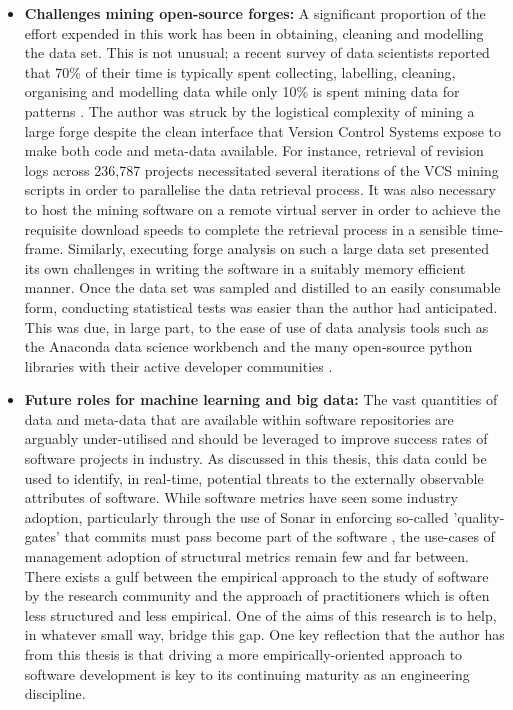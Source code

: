 \begin{itemize}
\item  \textbf{Challenges mining open-source forges: } A significant proportion of the effort expended in this work has been in obtaining, cleaning and modelling the data set. This is not unusual; a recent survey of data scientists reported that 70\% of their time is typically spent collecting, labelling, cleaning, organising and modelling data while only 10\% is spent mining data for patterns \citep{crowdflower}. The author was struck by the logistical complexity of mining a large forge despite the clean interface that Version Control Systems expose to make both code and meta-data available. For instance, retrieval of revision logs across 236,787 projects necessitated several iterations of the VCS mining scripts in order to parallelise the data retrieval process. It was also necessary to host the mining software on a remote virtual server in order to achieve the requisite download speeds to complete the retrieval process in a sensible time-frame. Similarly, executing forge analysis on such a large data set presented its own challenges in writing the software in a suitably memory efficient manner. Once the data set was sampled and distilled to an easily consumable form, conducting statistical tests was easier than the author had anticipated. This was due, in large part, to the ease of use of data analysis tools such as the Anaconda data science workbench and the many open-source python libraries with their active developer communities \citep{anaconda}.

\item  \textbf{Future roles for machine learning and big data: } The vast quantities of data and meta-data that are available within software repositories are arguably under-utilised and should be leveraged to improve success rates of software projects in industry. As discussed in this thesis, this data could be used to identify, in real-time, potential threats to the externally observable attributes of software. While software metrics have seen some industry adoption, particularly through the use of Sonar  in enforcing so-called 'quality-gates' that commits must pass become part of the software \citep{ampatzoglou2018framework, sonar}, the use-cases of management adoption of  structural metrics remain few and far between. There exists a gulf between the empirical approach to the study of software by the research community and the approach of practitioners which is often less structured and less empirical. One of the aims of this research is to help, in whatever small way, bridge this gap. One key reflection that the author has from this thesis is that driving a more empirically-oriented approach to software development is key to its continuing maturity as an engineering discipline.


\end{itemize}
